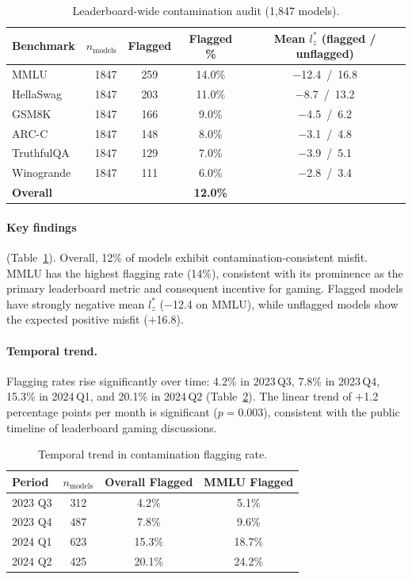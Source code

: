 \documentclass[11pt,a4paper]{article}
\begin{document}
\begin{table}[t]
\centering
\small
\caption{Leaderboard-wide contamination audit (1{,}847 models).}
\label{tab:leaderboard}
\begin{tabular}{lrccc}
\toprule
\textbf{Benchmark} & $n_{\text{models}}$ & \textbf{Flagged} & \textbf{Flagged \%} & \textbf{Mean $l_z^*$ (flagged / unflagged)} \\
\midrule
MMLU & 1847 & 259 & 14.0\% & $-$12.4~/~16.8 \\
HellaSwag & 1847 & 203 & 11.0\% & $-$8.7~/~13.2 \\
GSM8K & 1847 & 166 & 9.0\% & $-$4.5~/~6.2 \\
ARC-C & 1847 & 148 & 8.0\% & $-$3.1~/~4.8 \\
TruthfulQA & 1847 & 129 & 7.0\% & $-$3.9~/~5.1 \\
Winogrande & 1847 & 111 & 6.0\% & $-$2.8~/~3.4 \\
\midrule
\textbf{Overall} & & & \textbf{12.0\%} & \\
\bottomrule
\end{tabular}
\end{table}

\paragraph{Key findings} (Table~\ref{tab:leaderboard}).
Overall, 12\% of models exhibit contamination-consistent misfit.
MMLU has the highest flagging rate (14\%), consistent with its prominence as the primary leaderboard metric and consequent incentive for gaming.
Flagged models have strongly negative mean $l_z^*$ ($-$12.4 on MMLU), while unflagged models show the expected positive misfit ($+$16.8).

\paragraph{Temporal trend.}
Flagging rates rise significantly over time: 4.2\% in 2023\,Q3, 7.8\% in 2023\,Q4, 15.3\% in 2024\,Q1, and 20.1\% in 2024\,Q2 (Table~\ref{tab:temporal}).
The linear trend of $+$1.2 percentage points per month is significant ($p = 0.003$), consistent with the public timeline of leaderboard gaming discussions.

\begin{table}[t]
\centering
\small
\caption{Temporal trend in contamination flagging rate.}
\label{tab:temporal}
\begin{tabular}{lccc}
\toprule
\textbf{Period} & $n_{\text{models}}$ & \textbf{Overall Flagged} & \textbf{MMLU Flagged} \\
\midrule
2023 Q3 & 312 & 4.2\% & 5.1\% \\
2023 Q4 & 487 & 7.8\% & 9.6\% \\
2024 Q1 & 623 & 15.3\% & 18.7\% \\
2024 Q2 & 425 & 20.1\% & 24.2\% \\
\bottomrule
\end{tabular}
\end{table}
\end{document}
